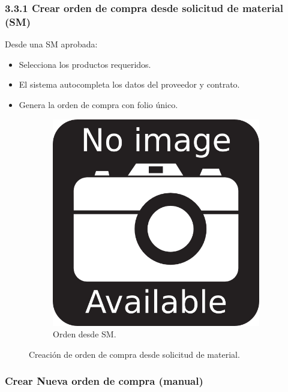 \subsubsection{3.3.1 Crear orden de compra desde solicitud de material (SM)}

Desde una SM aprobada:

\begin{itemize}
    \item Selecciona los productos requeridos.
    \item El sistema autocompleta los datos del proveedor y contrato.
    \item Genera la orden de compra con folio único.
\end{itemize}

\begin{figure}[h]
\centering
\begin{subfigure}{0.4\textwidth}
    \includegraphics[width=\textwidth]{imgs/no-image.png}
    \caption{Orden desde SM.}
    \label{fig:admin4}
\end{subfigure}
\caption{Creación de orden de compra desde solicitud de material.}
\end{figure}

\subsubsection{Crear Nueva orden de compra (manual)}

